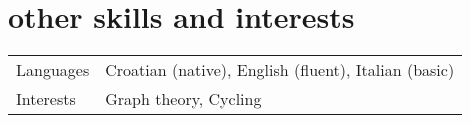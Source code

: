 \documentclass[a4paper]{article}
\makeatletter
\newlength{\tablewidth}
\newenvironment{skills}{%
\setlength{\tablewidth}{\linewidth}
\addtolength{\tablewidth}{-2\tabcolsep}
\begin{tabular}{@{}p{0.15\tablewidth}p{0.85\tablewidth}@{}}
}{%
\end{tabular}
}
\makeatother
\begin{document}
\section{other skills and interests}
\begin{skills}
    Languages & Croatian (native), English (fluent), Italian (basic) \\
    Interests & Graph theory, Cycling \\
\end{skills}
\end{document}

